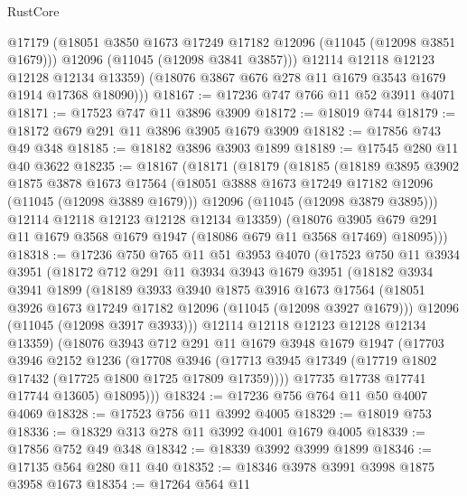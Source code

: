 \begin{lexlean}{RustCore}
\begin{coremodule}
            @17179
            (@18051 @3850 @1673 @17249 @17182 @12096 (@11045 (@12098 @3851 @1679)))
            @12096
            (@11045 (@12098 @3841 @3857)))
          @12114
          @12118
          @12123
          @12128
          @12134
          @13359)
        (@18076 @3867 @676 @278 @11 @1679 @3543 @1679 @1914 @17368 @18090)))
@18167 := @17236 @747 @766 @11 @52 @3911 @4071
@18171 := @17523 @747 @11 @3896 @3909
@18172 := @18019 @744
@18179 := @18172 @679 @291 @11 @3896 @3905 @1679 @3909
@18182 := @17856 @743 @49 @348
@18185 := @18182 @3896 @3903 @1899
@18189 := @17545 @280 @11 @40 @3622
@18235 := @18167
    (@18171
      (@18179
        (@18185
          (@18189
            @3895
            @3902
            @1875
            @3878
            @1673
            @17564
            (@18051 @3888 @1673 @17249 @17182 @12096 (@11045 (@12098 @3889 @1679)))
            @12096
            (@11045 (@12098 @3879 @3895)))
          @12114
          @12118
          @12123
          @12128
          @12134
          @13359)
        (@18076 @3905 @679 @291 @11 @1679 @3568 @1679 @1947 (@18086 @679 @11 @3568 @17469) @18095)))
@18318 := @17236
    @750
    @765
    @11
    @51
    @3953
    @4070
    (@17523
      @750
      @11
      @3934
      @3951
      (@18172
        @712
        @291
        @11
        @3934
        @3943
        @1679
        @3951
        (@18182
          @3934
          @3941
          @1899
          (@18189
            @3933
            @3940
            @1875
            @3916
            @1673
            @17564
            (@18051 @3926 @1673 @17249 @17182 @12096 (@11045 (@12098 @3927 @1679)))
            @12096
            (@11045 (@12098 @3917 @3933)))
          @12114
          @12118
          @12123
          @12128
          @12134
          @13359)
        (@18076
          @3943
          @712
          @291
          @11
          @1679
          @3948
          @1679
          @1947
          (@17703
            @3946
            @2152
            @1236
            (@17708
              @3946
              (@17713 @3945 @17349 (@17719 @1802 @17432 (@17725 @1800 @1725 @17809 @17359))))
            @17735
            @17738
            @17741
            @17744
            @13605)
          @18095)))
@18324 := @17236 @756 @764 @11 @50 @4007 @4069
@18328 := @17523 @756 @11 @3992 @4005
@18329 := @18019 @753
@18336 := @18329 @313 @278 @11 @3992 @4001 @1679 @4005
@18339 := @17856 @752 @49 @348
@18342 := @18339 @3992 @3999 @1899
@18346 := @17135 @564 @280 @11 @40
@18352 := @18346 @3978 @3991 @3998 @1875 @3958 @1673
@18354 := @17264 @564 @11

\end{coremodule}
\end{lexlean}

